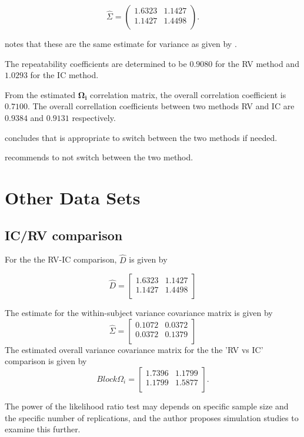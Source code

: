 \documentclass[12pt, a4paper]{report}
\theoremstyle{plain}
\theoremstyle{definition}
\theoremstyle{remark}
\begin{document}
\begin{equation}\hat{\Sigma}=\left(
\begin{array}{cc}
1.6323 & 1.1427 \\
1.1427 & 1.4498 \\
\end{array}
\right).
\end{equation}

\citet{ARoy2009} notes that these are the same estimate for variance as given by \citet{BA99}.


The repeatability coefficients are determined to be $0.9080$ for the RV method and $1.0293$ for the IC method.

From the estimated $\boldsymbol{\Omega_{i}}$ correlation matrix, the overall correlation coefficient is $0.7100$.
The overall correllation coefficients between two methods RV and IC are $0.9384$ and $0.9131$ respectively.

\citet{ARoy2009} concludes that is appropriate to switch between the two methods if needed.



\citet{ARoy2009} recommends to not switch between the two method.




\chapter{Other Data Sets}
\section{IC/RV comparison}

For the the RV-IC comparison, $\hat{D}$ is given by


\begin{equation}
\hat{D}= \left[ \begin{array}{cc}
1.6323 & 1.1427  \\
1.1427 & 1.4498 \\
\end{array} \right]
\end{equation}

The estimate for the within-subject variance covariance matrix is
given by
\begin{equation}
\hat{\Sigma}= \left[ \begin{array}{cc}
0.1072 & 0.0372  \\
0.0372 & 0.1379  \\
\end{array}\right]
\end{equation}
The estimated overall variance covariance matrix for the the 'RV
vs IC' comparison is given by
\begin{equation}
Block \Omega_{i}= \left[ \begin{array}{cc}
1.7396 & 1.1799  \\
1.1799 & 1.5877  \\
\end{array} \right].
\end{equation}

The power of the
likelihood ratio test may depends on specific sample size and the
specific number of  replications, and the author proposes
simulation studies to examine this further.
\end{document}
